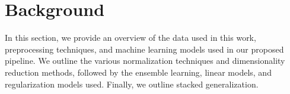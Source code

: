 \section{Background}\label{sec:background}
In this section, we provide an overview of the data used in this work, preprocessing techniques, and machine learning models used in our proposed pipeline.
We outline the various normalization techniques and dimensionality reduction methods, followed by the ensemble learning, linear models, and regularization models used.
Finally, we outline stacked generalization.




